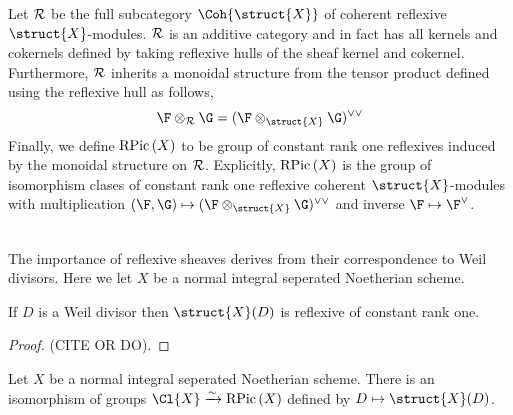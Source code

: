 \documentclass[12pt]{article}
\begin{document}
\begin{defn}
Let $\mathcal{R}$ be the full subcategory $\Coh{\struct{X}}$ of coherent reflexive $\struct{X}$-modules. $\mathcal{R}$ is an additive category   and in fact has all kernels and cokernels defined by taking reflexive hulls of the sheaf kernel and cokernel. Furthermore, $\mathcal{R}$ inherits a monoidal structure from the tensor product defined using the reflexive hull as follows,
\[ \F \otimes_\R \G = (\F \otimes_{\struct{X}} \G)^{\vee \vee} \]
Finally, we define $\mathrm{RPic}\left( X \right)$ to be group of constant rank one reflexives induced by the monoidal structure on $\mathcal{R}$. Explicitly, $\mathrm{RPic}\left( X \right)$ is the group of isomorphism clases of constant rank one reflexive coherent $\struct{X}$-modules with multiplication $(\F, \G) \mapsto (\F \otimes_{\struct{X}} \G)^{\vee \vee}$ and inverse $\F \mapsto \F^\vee$. 
\end{defn}
\noindent\\
The importance of reflexive sheaves derives from their correspondence to Weil divisors. Here we let $X$ be a normal integral seperated Noetherian scheme. 

\begin{prop}
If $D$ is a Weil divisor then $\struct{X}(D)$ is reflexive of constant rank one. 
\end{prop}

\begin{proof}
(CITE OR DO).
\end{proof}

\begin{theorem}
Let $X$ be a normal integral seperated Noetherian scheme. There is an isomorphism of groups $\Cl{X} \xrightarrow{\sim} \RPic{X}$ defined by $D \mapsto \struct{X}(D)$.
\end{theorem}
\end{document}
